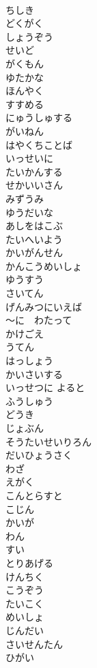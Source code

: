 \documentclass[8pt]{extreport}
\begin{document}
\begin{CJK}{UTF8}{min}
\\	ちしき
\\	どくがく
\\	しょうぞう
\\	せいど
\\	がくもん
\\	ゆたかな
\\	ほんやく
\\	すすめる
\\	にゅうしゅする
\\	がいねん
\\	はやくちことば
\\	いっせいに
\\	たいかんする
\\	せかいいさん
\\	みずうみ
\\	ゆうだいな
\\	あしをはこぶ
\\	たいへいよう
\\	かいがんせん
\\	かんこうめいしょ
\\	ゆうすう
\\	さいてん
\\	げんみつにいえば
\\	～に　わたって
\\	かけごえ
\\	うてん
\\	はっしょう
\\	かいさいする
\\	いっせつに よると
\\	ふうしゅう
\\	どうき
\\	じょぶん
\\	そうたいせいりろん
\\	だいひょうさく
\\	わざ
\\	えがく
\\	こんとらすと
\\	こじん
\\	かいが
\\	わん
\\	すい
\\	とりあげる
\\	けんちく
\\	こうぞう
\\	たいこく
\\	めいしょ
\\	じんだい
\\	さいせんたん
\\	ひがい

\end{CJK}
\end{document}
